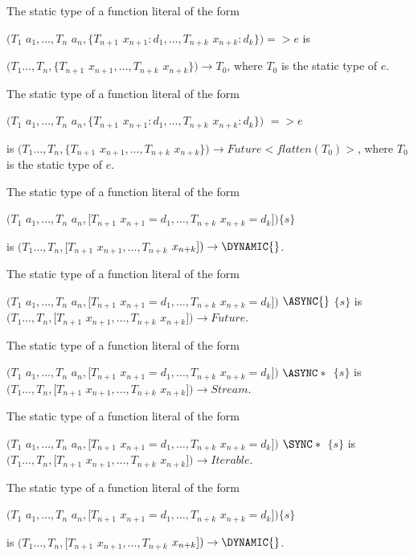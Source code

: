 \documentclass{article}
\begin{document}
\LMHash{}
The static type of a function literal of the form 

$(T_1$ $a_1, \ldots, T_n$ $a_n, \{T_{n+1}$ $x_{n+1} : d_1, \ldots,  T_{n+k}$ $x_{n+k} : d_k\}) => e$ 
is 

$(T_1 \ldots, T_n, \{T_{n+1}$ $x_{n+1}, \ldots, T_{n+k}$ $x_{n+k}\}) \rightarrow T_0$, where $T_0$ is the static type of $e$. 

\LMHash{}
The static type of a function literal of the form 

$(T_1$ $a_1, \ldots, T_n$ $a_n, \{T_{n+1}$ $x_{n+1} : d_1, \ldots,  T_{n+k}$ $x_{n+k} : d_k\})$ \ASYNC{}  $=> e$

is $(T_1 \ldots, T_n, \{T_{n+1}$ $x_{n+1}, \ldots, T_{n+k}$ $x_{n+k}\}) \rightarrow Future<flatten(T_0)>$, where $T_0$ is the static type of $e$. 

\LMHash{}
The static type of a function literal of the form  

$(T_1$ $a_1, \ldots, T_n$ $a_n, [T_{n+1}$ $x_{n+1} = d_1, \ldots,  T_{n+k}$ $x_{n+k}= d_k])\{s\}$ 

is $(T_1 \ldots, T_n, [T_{n+1}$ $x_{n+1}, \ldots, T_{n+k}$ $x_{n+k}]) \rightarrow  \DYNAMIC{}$.

\LMHash{}
The static type of a function literal of the form  

$(T_1$ $a_1, \ldots, T_n$ $a_n, [T_{n+1}$ $x_{n+1} = d_1, \ldots,  T_{n+k}$ $x_{n+k}= d_k])$ $ \ASYNC{}$ $\{s\}$ 
is $(T_1 \ldots, T_n, [T_{n+1}$ $x_{n+1}, \ldots, T_{n+k}$ $x_{n+k}]) \rightarrow Future$. 

\LMHash{}
The static type of a function literal of the form  

$(T_1$ $a_1, \ldots, T_n$ $a_n, [T_{n+1}$ $x_{n+1} = d_1, \ldots,  T_{n+k}$ $x_{n+k}= d_k])$ $ \ASYNC*{}$ $\{s\}$ 
is $(T_1 \ldots, T_n, [T_{n+1}$ $x_{n+1}, \ldots, T_{n+k}$ $x_{n+k}]) \rightarrow Stream$. 

\LMHash{}
The static type of a function literal of the form  

$(T_1$ $a_1, \ldots, T_n$ $a_n, [T_{n+1}$ $x_{n+1} = d_1, \ldots,  T_{n+k}$ $x_{n+k}= d_k])$ $ \SYNC*{}$ $\{s\}$ 
is $(T_1 \ldots, T_n, [T_{n+1}$ $x_{n+1}, \ldots, T_{n+k}$ $x_{n+k}]) \rightarrow Iterable$. 


\LMHash{}
The static type of a function literal of the form  

$(T_1$ $a_1, \ldots, T_n$ $a_n, [T_{n+1}$ $x_{n+1} = d_1, \ldots,  T_{n+k}$ $x_{n+k}= d_k])\{s\}$ 

is $(T_1 \ldots, T_n, [T_{n+1}$ $x_{n+1}, \ldots, T_{n+k}$ $x_{n+k}]) \rightarrow  \DYNAMIC{}$. 
\end{document}
